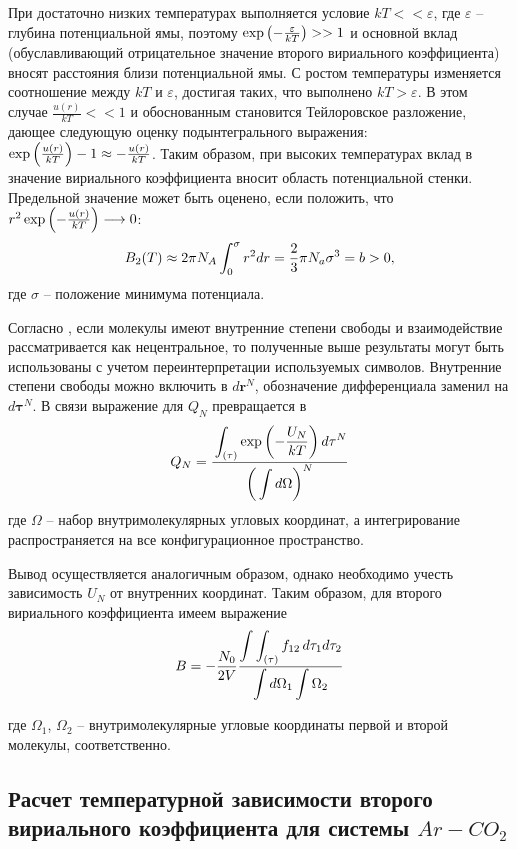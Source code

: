 При достаточно низких температурах выполняется условие $k T << \varepsilon$, где $\varepsilon$ -- глубина потенциальной ямы, поэтому $\exp \left( - \frac{\varepsilon}{k T} \right) >> 1$ и основной вклад (обуславливающий отрицательное значение второго вириального коэффициента) вносят расстояния близи потенциальной ямы. С ростом температуры изменяется соотношение между $k T$ и $\varepsilon$, достигая таких, что выполнено $k T > \varepsilon$. В этом случае $\frac{u(r)}{k T} << 1$ и обоснованным становится Тейлоровское разложение, дающее следующую оценку подынтегрального выражения: $\exp \left( \frac{u(r)}{kT} \right) - 1 \approx - \frac{u(r)}{kT}$. Таким образом, при высоких температурах вклад в значение вириального коэффициента вносит область потенциальной стенки. Предельной значение может быть оценено, если положить, что $r^2 \exp \left( -\frac{u(r)}{kT} \right) \longrightarrow 0$:
\vverh
\begin{gather}
	B_2(T) \approx 2 \pi N_A \int_0^\sigma r^2 dr = \frac{2}{3} \pi N_a \sigma^3 = b > 0, \notag
\end{gather}
где $\sigma$ -- положение минимума потенциала.

Согласно \cite{meyson}, если молекулы имеют внутренние степени свободы и взаимодействие рассматривается как нецентральное, то полученные выше результаты могут быть использованы с учетом переинтерпретации используемых символов. Внутренние степени свободы можно включить в $d \mathbf{r}^N$, обозначение дифференциала заменил на $d \mathbf{\tau}^N$. В связи выражение для $Q_N$ превращается в 
\vverh
\begin{gather}
	Q_N = \frac{\displaystyle \strut\int_{\left( \tau \right)} \exp \left( - \frac{U_N}{k T}\right) d \mathbf{\tau}^N}{\displaystyle \left( \strut\int d \Omega \right)^N} \notag
\end{gather}
где $\Omega$ -- набор внутримолекулярных угловых координат, а интегрирование распространяется на все конфигурационное пространство.

Вывод осуществляется аналогичным образом, однако необходимо учесть зависимость $U_N$ от внутренних координат. Таким образом, для второго вириального коэффициента имеем выражение
\vverh
\begin{gather}
	B = - \frac{N_0}{2 V} \frac{\displaystyle \int \int_{\left( \tau \right)} f_{12} \, d \tau_1 d \tau_2}{\displaystyle  \int d \Omega_1 \int \Omega_2} \label{vircoef}
\end{gather}

где $\Omega_1$, $\Omega_2$ -- внутримолекулярные угловые координаты первой и второй молекулы, соответственно.

\subsection{Расчет температурной зависимости второго вириального коэффициента для системы $Ar-CO_2$}

